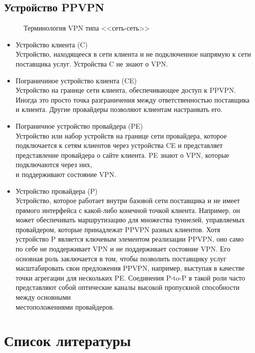\documentclass[a4page]{article}
\begin{document}
\subsection{Устройство PPVPN}

\begin{figure}

\caption{Терминология VPN типа <<сеть-сеть>>}
\end{figure}

\begin{itemize}
  \item Устройство клиента (C)\\
Устройство, находящееся в сети клиента и не подключенное напрямую к сети поставщика услуг. Устройства C не знают о VPN.

\item Пограничиное устройство клиента (CE)\\
Устройство на границе сети клиента, обеспечивающее доступ к PPVPN. Иногда это просто точка разграничения между ответственностью поставщика и клиента. Другие провайдеры позволяют клиентам настраивать его.

\item Пограничное устройство провайдера (PE)\\
Устройство или набор устройств на границе сети провайдера, которое подключается к сетям клиентов через устройства CE и представляет представление провайдера о сайте клиента. PE знают о VPN, которые подключаются через них,\\ и поддерживают состояние VPN.

\item Устройство провайдера (P)\\
Устройство, которое работает внутри базовой сети поставщика и не имеет прямого интерфейса с какой-либо конечной точкой клиента. Например, он может обеспечивать маршрутизацию для множества туннелей, управляемых провайдером, которые принадлежат PPVPN разных клиентов. Хотя устройство P является ключевым элементом реализации PPVPN, оно само по себе не поддерживает VPN и не поддерживает состояние VPN. Его основная роль заключается в том, чтобы позволить поставщику услуг масштабировать свои предложения PPVPN, например, выступая в качестве точки агрегации для нескольких PE. Соединения P-to-P в такой роли часто представляют собой оптические каналы высокой пропускной способности между основными\\ местоположениями провайдеров.
\end{itemize}


\newpage

\section{Список литературы}

\printbibliography [heading=none]
\end{document}
